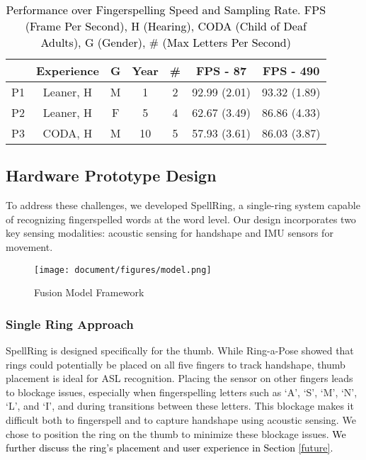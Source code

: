  \begin{table}[t]

\textcolor{black}{
\caption{\textcolor{black}{Performance over Fingerspelling Speed and Sampling Rate. FPS (Frame Per Second), H (Hearing), CODA (Child of Deaf Adults), G (Gender), \# (Max Letters Per Second)}}
\begin{tabular}{c|c|c|c|c|c|c}
\hline
   & Experience    & G & Year & \# & FPS - 87     & FPS - 490    \\ \hline
P1 & Leaner, H & M      & 1    & 2                                                                       & 92.99 (2.01) & 93.32 (1.89) \\ \hline
P2 & Leaner, H & F      & 5    & 4                                                                       & 62.67 (3.49) & 86.86 (4.33) \\ \hline
P3 & CODA, H       & M      & 10   & 5                                                                       & 57.93 (3.61) & 86.03 (3.87) \\ \hline
\end{tabular}
}
\end{table}
\label{fig:performance_pilot}
\subsection{Hardware Prototype Design}
To address these challenges, we developed SpellRing, a single-ring system capable of recognizing fingerspelled words at the word level. Our design incorporates two key sensing modalities: acoustic sensing for handshape and IMU sensors for movement.



\begin{figure*}[t]
  \texttt{[image: document/figures/model.png]}
  \caption{Fusion Model Framework}
  \label{fig:model}
\end{figure*}

\subsubsection{Single Ring Approach}

SpellRing is designed specifically for the thumb. While Ring-a-Pose \cite{yu2024ring} showed that rings could potentially be placed on all five fingers to track handshape, thumb placement is ideal for ASL recognition. Placing the sensor on other fingers leads to blockage issues, especially when fingerspelling letters such as `A', `S', `M', `N', `L', and `I', and during transitions between these letters. This blockage makes it difficult both to fingerspell and to capture handshape using acoustic sensing. We chose to position the ring on the thumb to minimize these blockage issues. \textcolor{black}{We further discuss the ring's placement and user experience in Section \ref{future}.}


